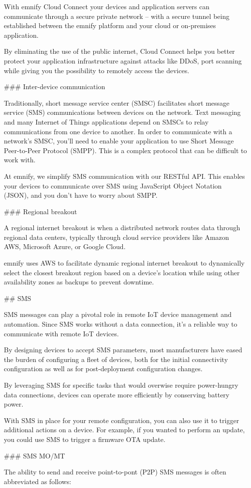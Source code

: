 \documentclass[11pt, oneside]{article}   	%
\begin{document}
\begin{markdown}
With emnify Cloud Connect your devices and application servers can communicate through a secure private network -- with a secure tunnel being established between the emnify platform and your cloud or on-premises application.

By eliminating the use of the public internet, Cloud Connect helps you better protect your application infrastructure against attacks like DDoS, port scanning while giving you the possibility to remotely access the devices.

### Inter-device communication

Traditionally, short message service center (SMSC) facilitates short message service (SMS) communications between devices on the network.
Text messaging and many Internet of Things applications depend on SMSCs to relay communications from one device to another.
In order to communicate with a network's SMSC, you'll need to enable your application to use Short Message Peer-to-Peer Protocol (SMPP).
This is a complex protocol that can be difficult to work with.

At emnify, we simplify SMS communication with our RESTful API.
This enables your devices to communicate over SMS using JavaScript Object Notation (JSON), and you don't have to worry about SMPP.

### Regional breakout

A regional internet breakout is when a distributed network routes data through regional data centers, typically through cloud service providers like Amazon AWS, Microsoft Azure, or Google Cloud.

emnify uses AWS to facilitate dynamic regional internet breakout to dynamically select the closest breakout region based on a device's location while using other availability zones as backups to prevent downtime.

## SMS

SMS messages can play a pivotal role in remote IoT device management and automation.
Since SMS works without a data connection, it's a reliable way to communicate with remote IoT devices.

By designing devices to accept SMS parameters, most manufacturers have eased the burden of configuring a fleet of devices, both for the initial connectivity configuration as well as for post-deployment configuration changes.

By leveraging SMS for specific tasks that would overwise require power-hungry data connections, devices can operate more efficiently by conserving battery power.

With SMS in place for your remote configuration, you can also use it to trigger additional actions on a device.
For example, if you wanted to perform an update, you could use SMS to trigger a firmware OTA update.

### SMS MO/MT

The ability to send and receive point-to-pont (P2P) SMS messages is often abbreviated as follows:

\end{markdown}
\end{document}
